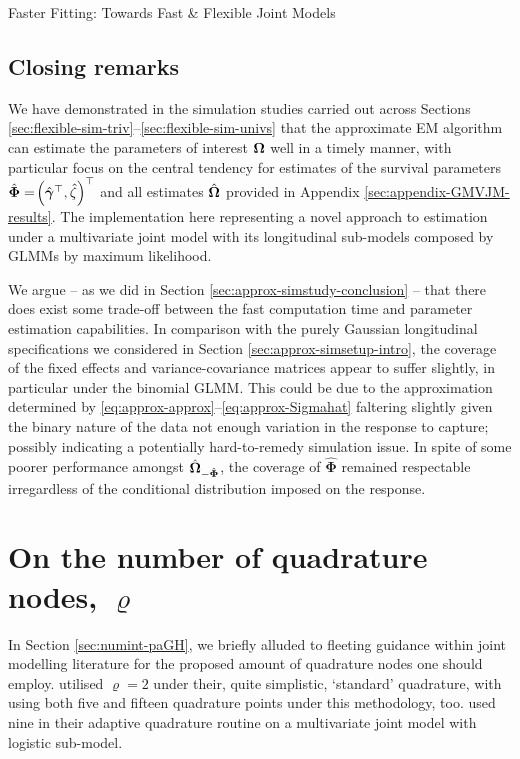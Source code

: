 \begin{chapter}{\label{cha:flexible}Faster Fitting: Towards Fast \& Flexible Joint Models}
\subsection{Closing remarks}\label{sec:flexible-simstudy-conclusion}
We have demonstrated in the simulation studies carried out across Sections \ref{sec:flexible-sim-triv}--\ref{sec:flexible-sim-univs} that the approximate EM algorithm can estimate the parameters of interest $\bm{\mathrm{\Omega}}$ well in a timely manner, with particular focus on the central tendency for estimates of the survival parameters $\hat{\bm{\Phi}}=\!\left(\hat{\bm{\gamma}}^\top,\hat{\zeta}\right)^\top$ and all estimates $\hat{\bm{\Omega}}$ provided in Appendix \ref{sec:appendix-GMVJM-results}. The implementation here representing a novel approach to estimation under a multivariate joint model with its longitudinal sub-models composed by GLMMs by maximum likelihood.

We argue -- as we did in Section \ref{sec:approx-simstudy-conclusion} -- that there does exist some trade-off between the fast computation time and parameter estimation capabilities. In comparison with the purely Gaussian longitudinal specifications we considered in Section \ref{sec:approx-simsetup-intro}, the coverage of the fixed effects and variance-covariance matrices appear to suffer slightly, in particular under the binomial GLMM. This could be due to the approximation determined by \eqref{eq:approx-approx}--\eqref{eq:approx-Sigmahat} faltering slightly given the binary nature of the data \ie not enough variation in the response to capture; possibly indicating a potentially hard-to-remedy simulation issue. In spite of some poorer performance amongst $\hat{\bm{\Omega}}_{-\hat{\bm{\Phi}}}$, the coverage of $\hat{\bm{\Phi}}$ remained respectable irregardless of the conditional distribution imposed on the response.

\section{On the number of quadrature nodes, \texorpdfstring{$\varrho$}{rho}}\label{sec:flexible-quadrature-intro}
In Section \ref{sec:numint-paGH}, we briefly alluded to fleeting guidance within joint modelling literature for the proposed amount of quadrature nodes one should employ. \citet{Wulfsohn97} utilised $\varrho=2$ under their, quite simplistic, `standard' quadrature, with \citet{Crowther2016} using both five and fifteen quadrature points under this methodology, too. \citet{Bernhardt15} used nine in their adaptive quadrature routine on a multivariate joint model with logistic sub-model.


\end{chapter}
